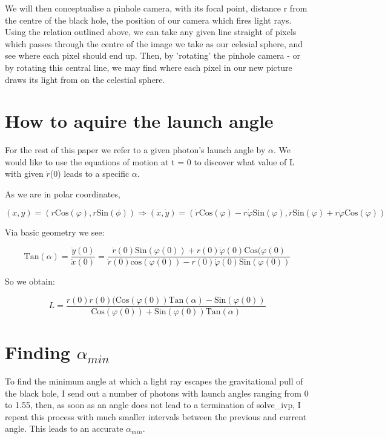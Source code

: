\documentclass[oneside,openright,frontopenright]{dmathesis}
\begin{document}
	We will then conceptualise a pinhole camera, with its focal point, distance r from the centre of the black hole, the position of our camera which fires light rays. Using the relation outlined above, we can take any given line straight of pixels which passes through the centre of the image we take as our celesial sphere, and see where each pixel should end up. Then, by 'rotating' the pinhole camera - or by rotating this central line, we may find where each pixel in our new picture draws its light from on the celestial sphere.

\section{How to aquire the launch angle}

	For the rest of this paper we refer to a given photon's launch angle by $\alpha$. We would like to use the equations of motion at t = 0 to discover what value of L with given $\dot{r}$(0) leads to a specific $\alpha$.

	As we are in polar coordinates, 

			\[(x, y) = (r\mbox{Cos}(\varphi), r\mbox{Sin}(\phi)) \Rightarrow (\dot{x}, \dot{y}) = (\dot{r}\mbox{Cos}(\varphi) - r\dot{\varphi}\mbox{Sin}(\varphi), \dot{r}\mbox{Sin}(\varphi) + r\dot{\varphi}\mbox{Cos}(\varphi))\]
	
	Via basic geometry we see:
			
			\[\mbox{Tan}(\alpha) = \frac{\dot{y}(0)}{\dot{x}(0)} = \frac{\dot{r}(0)\mbox{Sin}(\varphi(0)) + r(0)\dot{\varphi}(0)\mbox{Cos}(\varphi(0)}{\dot{r}(0)\mbox{cos}(\varphi(0)) - r(0)\dot{\varphi}(0)\mbox{Sin}(\varphi(0))}\]

	So we obtain:

			\[ L = \frac{r(0)\dot{r}(0)(\mbox{Cos}(\varphi(0))\mbox{Tan}(\alpha)-\mbox{Sin}(\varphi(0))}{\mbox{Cos}(\varphi(0))+\mbox{Sin}(\varphi(0))\mbox{Tan}(\alpha)}\]

\section{Finding $\alpha_{min}$}
	
	To find the minimum angle at which a light ray escapes the gravitational pull of the black hole, I send out a number of photons with launch angles ranging from 0 to 1.55, then, as soon as an angle does not lead to a termination of solve\_ivp, I repeat this process with much smaller intervals between the previous and current angle. This leads to an accurate $\alpha_{min}$.
\end{document}
